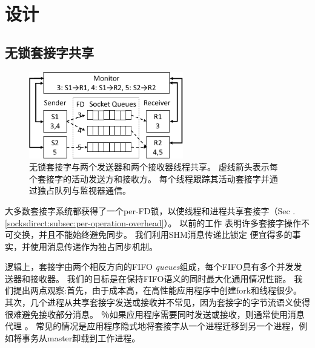 
\section{设计}
\label{socksdirect:sec:design}


\subsection{无锁套接字共享}
\label{socksdirect:subsec:fork}


\begin{figure}[htbp]
	\centering
	\includegraphics[width=0.6\textwidth]{images/queue_arch}
	
	\caption{无锁套接字与两个发送器和两个接收器线程共享。 虚线箭头表示每个套接字的活动发送方和接收方。 每个线程跟踪其活动套接字并通过独占队列与监视器通信。}
	\label{socksdirect:fig:queue-arch}
\end{figure}

大多数套接字系统都获得了一个per-FD锁，以使线程和进程共享套接字（Sec .~ \ref {socksdirect:subsec:per-operation-overhead}）。
以前的工作 \cite {boyd2010analysis,clements2015scalable}表明许多套接字操作不可交换，并且不能始终避免同步。
我们利用SHM消息传递比锁定 \cite {roghanchi2017ffwd}便宜得多的事实，并使用消息传递作为独占同步机制。

逻辑上，套接字由两个相反方向的FIFO \emph {queues}组成，每个FIFO具有多个并发发送器和接收器。
我们的目标是在保持FIFO语义的同时最大化通用情况性能。
我们提出两点观察:首先，由于成本高，在高性能应用程序中创建fork和线程很少。
其次，几个进程从共享套接字发送或接收并不常见，因为套接字的字节流语义使得很难避免接收部分消息。
％如果应用程序需要同时发送或接收，则通常使用消息代理 \cite {hintjens2013zeromq,rabbitmq2017rabbitmq,kreps2011kafka}。
常见的情况是应用程序隐式地将套接字从一个进程迁移到另一个进程，例如将事务从master卸载到工作进程。

